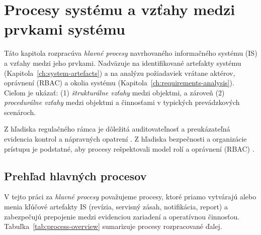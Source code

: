 
\chapter{Procesy systému a vzťahy medzi prvkami systému}
\label{ch:system-processes}

Táto kapitola rozpracúva \emph{hlavné procesy} navrhovaného informačného systému (IS) a vzťahy medzi jeho prvkami.
Nadväzuje na identifikované artefakty systému (Kapitola~\ref{ch:system-artefacts}) a na analýzu požiadaviek vrátane aktérov, oprávnení (RBAC) a okolia systému (Kapitola~\ref{ch:requirements-analysis}).
Cieľom je ukázať:
(1) \emph{štrukturálne vzťahy} medzi objektmi, a zároveň
(2) \emph{procedurálne vzťahy} medzi objektmi a činnosťami v typických prevádzkových scenároch.

Z hľadiska regulačného rámca je dôležitá auditovateľnosť a preukázateľná evidencia kontrol a nápravných opatrení \cite{EUDWD2020,SKVyhlaska912023}.
Z hľadiska bezpečnosti a organizácie prístupu je podstatné, aby procesy rešpektovali model rolí a oprávnení (RBAC) \cite{NISTRBACGlossary,NISTRBACProject}.

\section{Prehľad hlavných procesov}
\label{sec:process-overview}

V tejto práci za \emph{hlavné procesy} považujeme procesy, ktoré priamo vytvárajú alebo menia kľúčové artefakty IS (revízia, servisný zásah, notifikácia, report) a zabezpečujú prepojenie medzi evidenciou zariadení a operatívnou činnosťou.
Tabuľka~\ref{tab:process-overview} sumarizuje procesy rozpracované ďalej.

